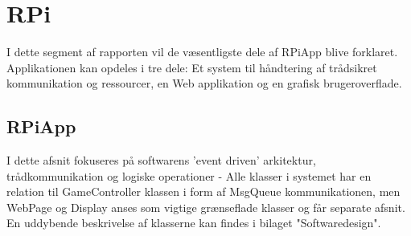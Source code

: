 \documentclass[Rapport/Rapport_main.tex]{subfiles}
\begin{document}
\section{RPi}
I dette segment af rapporten vil de væsentligste dele af RPiApp blive forklaret. Applikationen kan opdeles i tre dele: Et system til håndtering af trådsikret kommunikation og ressourcer, en Web applikation og en grafisk brugeroverflade. 
\subsection{RPiApp}
I dette afsnit fokuseres på softwarens 'event driven' arkitektur, trådkommunikation og logiske operationer - Alle klasser i systemet har en relation til GameController klassen i form af MsgQueue kommunikationen, men WebPage og Display anses som vigtige grænseflade klasser og får separate afsnit. 
En uddybende beskrivelse af klasserne kan findes i bilaget "Softwaredesign". 
\end{document}
